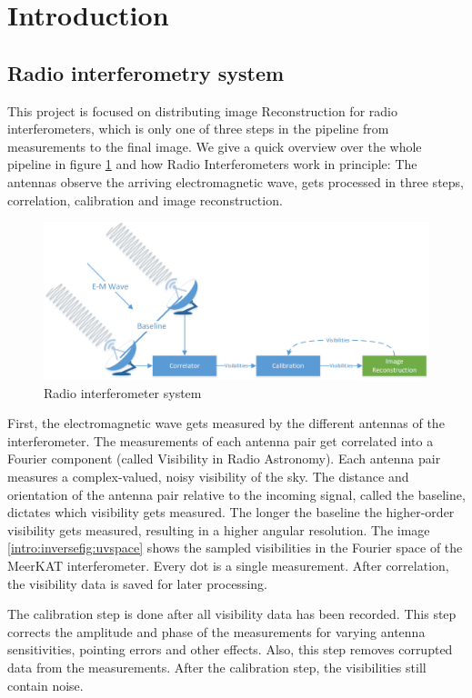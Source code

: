 \section{Introduction}

\subsection{Radio interferometry system}\label{intro:sys}
This project is focused on distributing image Reconstruction for radio interferometers, which is only one of three steps in the pipeline from measurements to the final image. We give a quick overview over the whole pipeline in figure \ref{intro:system} and how Radio Interferometers work in principle: The antennas observe the arriving electromagnetic wave, gets processed in three steps, correlation, calibration and image reconstruction. 

\begin{figure}[h]
	\centering
	\includegraphics[width=0.80\linewidth]{./chapters/01.intro/system.png}
	\caption{Radio interferometer system}
	\label{intro:system}
\end{figure}

First, the electromagnetic wave gets measured by the different antennas of the interferometer. The measurements of each antenna pair get correlated into a Fourier component (called Visibility in Radio Astronomy). Each antenna pair measures a complex-valued, noisy visibility of the sky. The distance and orientation of the antenna pair relative to the incoming signal, called the baseline, dictates which visibility gets measured. The longer the baseline the higher-order visibility gets measured, resulting in a higher angular resolution. The image \ref{intro:inversefig:uvspace} shows the sampled visibilities in the Fourier space of the MeerKAT interferometer. Every dot is a single measurement. After correlation, the visibility data is saved for later processing.

The calibration step is done after all visibility data has been recorded. This step corrects the amplitude and phase of the measurements for varying antenna sensitivities, pointing errors and other effects. Also, this step removes corrupted data from the measurements. After the calibration step, the visibilities still contain noise.


